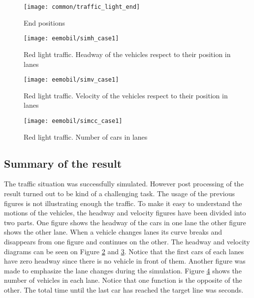 		\begin{figure}
			\centering
			\texttt{[image: common/traffic\_light\_end]}
			\caption{End positions}
			\label{fig:traffic_light_end}
		\end{figure}
		\begin{figure}
			\centering
			\texttt{[image: eemobil/simh\_case1]}
			\caption{Red light traffic. Headway of the vehicles respect to their position in lanes}
			\label{fig:red_light_situationh}
		\end{figure}
		\begin{figure}
			\centering
			\texttt{[image: eemobil/simv\_case1]}
			\caption{Red light traffic. Velocity of the vehicles respect to their position in lanes}
			\label{fig:red_light_situationv}
		\end{figure}
		\begin{figure}
			\centering
			\texttt{[image: eemobil/simcc\_case1]}
			\caption{Red light traffic. Number of cars in lanes }
			\label{fig:red_light_situationcc}
		\end{figure}
		\subsection*{Summary of the result}
		The traffic situation was successfully simulated. However post processing of the result turned out to be kind of a challenging task. The usage of the previous figures is not illustrating enough the traffic. To make it easy to understand the motions of the vehicles, the headway and velocity figures have been divided into two parts. One figure shows the headway of the cars in one lane the other figure shows the other lane. When a vehicle changes lanes its curve breaks and disappears from one figure and continues on the other.
		The headway and velocity diagrams can be seen on Figure \ref{fig:red_light_situationh} and \ref{fig:red_light_situationv}. Notice that the first cars of each lanes have zero headway since there is no vehicle in front of them.  Another figure was made to emphasize the lane changes during the simulation. Figure \ref{fig:red_light_situationcc} shows the number of vehicles in each lane. Notice that one function is the opposite of the other. The total time until the last car has reached the target line was seconds.
